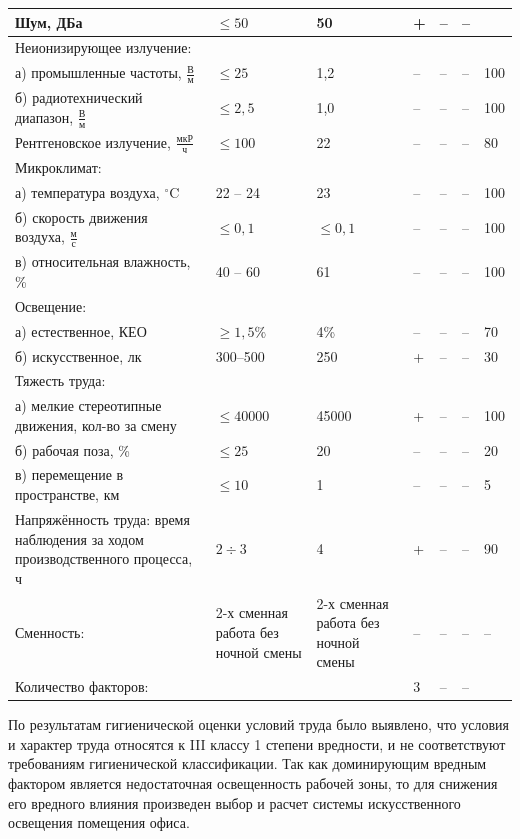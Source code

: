 {\begin{longtable}[c]{|p{7cm}|p{2cm}|p{2cm}|p{0.5cm}|p{0.5cm}|p{0.5cm}|p{2cm}|}
    Шум, ДБа & \(\le 50\) & 50 & + & -- & -- & \\
    \hline
    Неионизирующее излучение: & & & & & & \\
    а) промышленные частоты, \(\frac{\text{В}}{\text{м}}\)      & \(\le 25\)  & 1,2 & -- & -- & -- & 100 \\
    б) радиотехнический диапазон, \(\frac{\text{В}}{\text{м}}\) & \(\le 2,5\) & 1,0 & -- & -- & -- & 100 \\
    \hline
    Рентгеновское излучение, \(\frac{\text{мкР}}{\text{ч}}\)    & \(\le 100\) & 22          & -- & -- & -- & 80 \\
    \hline
    Микроклимат:                                                  &             &             &     &     &     &     \\
    а) температура воздуха, \(^{\circ}\mathrm{C}\)                & 22 -- 24    & 23          & --  & --  & --  & 100 \\
    б) скорость движения воздуха, \(\frac{\text{м}}{\text{с}}\)   & \(\le 0,1\) & \(\le 0,1\) & --  & --  & --  & 100 \\
    в) относительная влажность, \%                                & 40 -- 60    & 61          & --  & --  & --  & 100 \\
    \hline
    Освещение:            &               &     &     &     &     &    \\
    а) естественное, КЕО  & \(\ge 1,5\%\) & 4\% & --  & --  & --  & 70 \\
    б) искусственное, лк  & 300--500      & 250 &  +  & --  & --  & 30 \\
    \hline
    Тяжесть труда:         &               &     &     &     &     &    \\
    а) мелкие стереотипные
       движения, кол-во за
       смену                          & \(\le 40000\) & 45000 & +   & -- & -- & 100 \\
    б) рабочая поза, \%               & \(\le 25\)    & 20    & --  & -- & -- & 20  \\
    в) перемещение в пространстве, км & \(\le 10\)    & 1     & --  & -- & -- & 5   \\
    \hline
    Напряжённость труда: время наблюдения
    за ходом производственного процесса, ч & \(2 \div 3\) & 4 & + & -- & -- & 90 \\
    \hline
    Сменность: & 2-х сменная работа без ночной смены & 2-х сменная работа без ночной смены & -- & -- & -- & -- \\
    \hline
    Количество факторов: &  &  & 3 & -- & -- & \\
    \hline
\end{longtable}
}
По результатам гигиенической оценки условий труда было выявлено, что условия и характер труда относятся
к III классу 1 степени вредности, и не соответствуют требованиям гигиенической классификации.
Так как доминирующим вредным фактором является недостаточная освещенность рабочей зоны, то для снижения
его вредного влияния произведен выбор и расчет системы искусственного освещения помещения офиса. 

